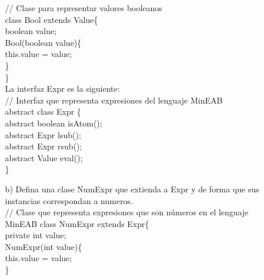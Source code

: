 \documentclass{article}
\begin{document}
\begin{itemize}
\begin{itemize}
            // Clase para representar valores booleanos\\
            class Bool extends Value\{\\
            \hspace*{0.6cm}boolean value;\\

            \hspace*{0.6cm}Bool(boolean value)\{\\
            \hspace*{1.2cm}this.value = value;\\
            \hspace*{0.6cm}\}\\
            \}\\

            La interfaz Expr es la siguiente:\\

            // Interfaz que representa expresiones del lenguaje MinEAB\\
            abstract class Expr \{\\
            \hspace*{0.65cm}abstract boolean isAtom();\\
            \hspace*{0.65cm}abstract Expr lsub();\\
            \hspace*{0.65cm}abstract Expr rsub();\\
            \hspace*{0.65cm}abstract Value eval();\\
            \}\\

            \item[b)] Defina una clase NumExpr que extienda a Expr y de forma que sus instancias correspondan a numeros.\\

            // Clase que representa expresiones que son números en el lenguaje MinEAB
            class NumExpr extends Expr\{\\
            \hspace*{0.6cm}private int value;\\
            
            \hspace*{0.6cm}NumExpr(int value)\{\\
            \hspace*{1.37cm}this.value = value;\\
            \hspace*{0.65cm}\}\\
            

\end{itemize}
\end{itemize}
\end{document}
